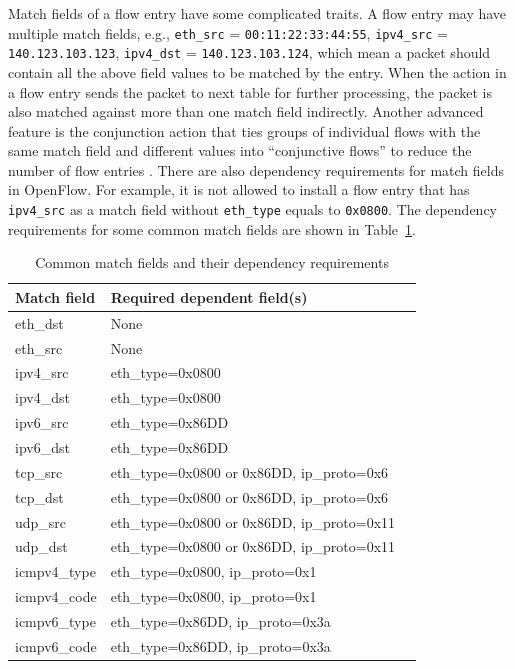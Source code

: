 Match fields of a flow entry have some complicated traits. A flow entry may have multiple match fields, e.g., \texttt{eth\_src} = \texttt{00:11:22:33:44:55}, \texttt{ipv4\_src} = \texttt{140.123.103.123}, \texttt{ipv4\_dst} = \texttt{140.123.103.124}, which mean a packet should contain all the above field values to be matched by the entry. When the action in a flow entry sends the packet to next table for further processing, the packet is also matched against more than one match field indirectly. Another advanced feature is the conjunction action that ties groups of individual flows with the same match field and different values into ``conjunctive flows'' to reduce the number of flow entries \cite{OVS_OFCTL}. There are also dependency requirements for match fields in OpenFlow. For example, it is not allowed to install a flow entry that has \texttt{ipv4\_src} as a match field without \texttt{eth\_type} equals to \texttt{0x0800}. The dependency requirements for some common match fields are shown in Table~\ref{table:match_fields_dependency}.

\begin{table}[H]
\centering
\caption{Common match fields and their dependency requirements}
\begin{tabular}{|l|l|l}
\hline Match field & Required dependent field(s) \\
\hline
\hline eth\_dst & None \\
\hline eth\_src & None \\
\hline ipv4\_src & eth\_type=0x0800 \\
\hline ipv4\_dst & eth\_type=0x0800 \\
\hline ipv6\_src & eth\_type=0x86DD \\
\hline ipv6\_dst & eth\_type=0x86DD \\
\hline tcp\_src & eth\_type=0x0800 or 0x86DD, ip\_proto=0x6 \\
\hline tcp\_dst & eth\_type=0x0800 or 0x86DD, ip\_proto=0x6 \\
\hline udp\_src & eth\_type=0x0800 or 0x86DD, ip\_proto=0x11 \\
\hline udp\_dst & eth\_type=0x0800 or 0x86DD, ip\_proto=0x11 \\
\hline icmpv4\_type & eth\_type=0x0800, ip\_proto=0x1 \\
\hline icmpv4\_code & eth\_type=0x0800, ip\_proto=0x1 \\
\hline icmpv6\_type & eth\_type=0x86DD, ip\_proto=0x3a \\
\hline icmpv6\_code & eth\_type=0x86DD, ip\_proto=0x3a \\
\hline
\end{tabular}
\label{table:match_fields_dependency}
\end{table}

